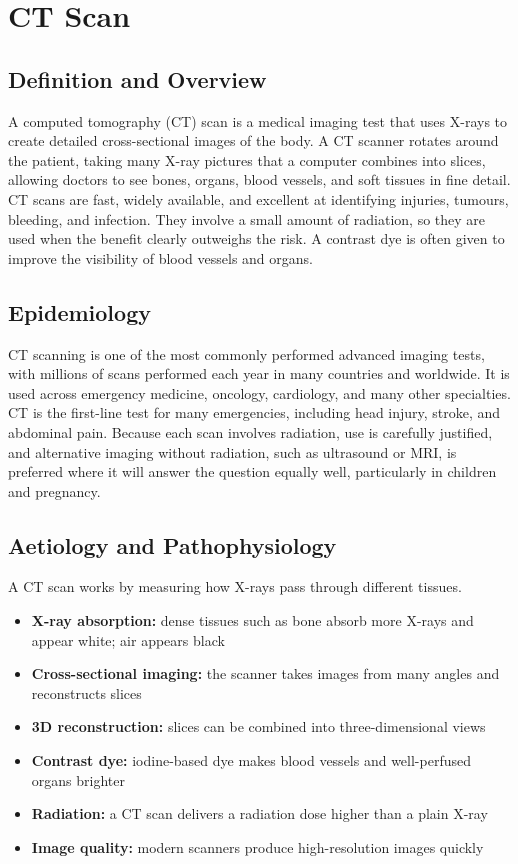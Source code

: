 \chapter{CT Scan}

\section*{Definition and Overview}
A computed tomography (CT) scan is a medical imaging test that uses X-rays to create detailed cross-sectional images of the body. A CT scanner rotates around the patient, taking many X-ray pictures that a computer combines into slices, allowing doctors to see bones, organs, blood vessels, and soft tissues in fine detail. CT scans are fast, widely available, and excellent at identifying injuries, tumours, bleeding, and infection. They involve a small amount of radiation, so they are used when the benefit clearly outweighs the risk. A contrast dye is often given to improve the visibility of blood vessels and organs.

\section*{Epidemiology}
CT scanning is one of the most commonly performed advanced imaging tests, with millions of scans performed each year in many countries and worldwide. It is used across emergency medicine, oncology, cardiology, and many other specialties. CT is the first-line test for many emergencies, including head injury, stroke, and abdominal pain. Because each scan involves radiation, use is carefully justified, and alternative imaging without radiation, such as ultrasound or MRI, is preferred where it will answer the question equally well, particularly in children and pregnancy.

\section*{Aetiology and Pathophysiology}
A CT scan works by measuring how X-rays pass through different tissues.

\begin{itemize}
    \item \textbf{X-ray absorption:} dense tissues such as bone absorb more X-rays and appear white; air appears black
    \item \textbf{Cross-sectional imaging:} the scanner takes images from many angles and reconstructs slices
    \item \textbf{3D reconstruction:} slices can be combined into three-dimensional views
    \item \textbf{Contrast dye:} iodine-based dye makes blood vessels and well-perfused organs brighter
    \item \textbf{Radiation:} a CT scan delivers a radiation dose higher than a plain X-ray
    \item \textbf{Image quality:} modern scanners produce high-resolution images quickly
\end{itemize}

